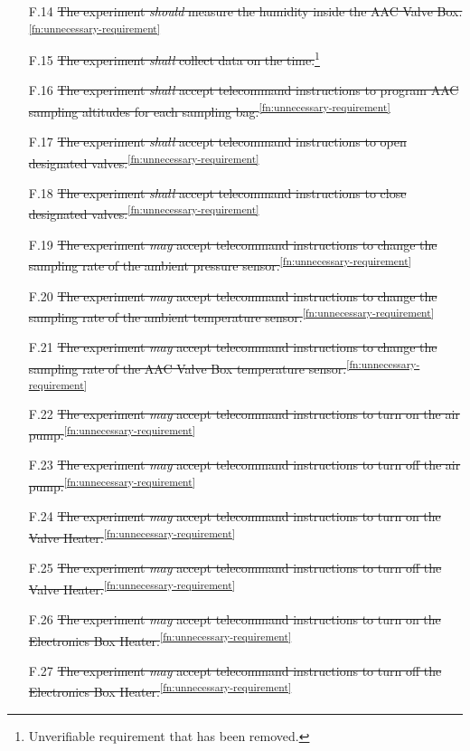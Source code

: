 \begin{enumerate}
    \item[F.14] \st{The experiment \textit{should} measure the humidity inside the AAC Valve Box.}\textsuperscript{\ref{fn:unnecessary-requirement}}
    \item[F.15] \st{The experiment \textit{shall} collect data on the time.}\footnote{Unverifiable requirement that has been removed.\label{fn:unverifiable-requirement}}
    \item[F.16] \st{The experiment \textit{shall} accept telecommand instructions to program AAC sampling altitudes for each sampling bag.}\textsuperscript{\ref{fn:unnecessary-requirement}}
    \item[F.17] \st{The experiment \textit{shall} accept telecommand instructions to open designated valves.}\textsuperscript{\ref{fn:unnecessary-requirement}}
    \item[F.18] \st{The experiment \textit{shall} accept telecommand instructions to close designated valves.}\textsuperscript{\ref{fn:unnecessary-requirement}}
    \item[F.19] \st{The experiment \textit{may} accept telecommand instructions to change the sampling rate of the ambient pressure sensor.}\textsuperscript{\ref{fn:unnecessary-requirement}}
    \item[F.20] \st{The experiment \textit{may} accept telecommand instructions to change the sampling rate of the ambient temperature sensor.}\textsuperscript{\ref{fn:unnecessary-requirement}}
    \item[F.21] \st{The experiment \textit{may} accept telecommand instructions to change the sampling rate of the AAC Valve Box temperature sensor.}\textsuperscript{\ref{fn:unnecessary-requirement}}
    \item[F.22] \st{The experiment \textit{may} accept telecommand instructions to turn on the air pump.}\textsuperscript{\ref{fn:unnecessary-requirement}}
    \item[F.23] \st{The experiment \textit{may} accept telecommand instructions to turn off the air pump.}\textsuperscript{\ref{fn:unnecessary-requirement}}
    \item[F.24] \st{The experiment \textit{may} accept telecommand instructions to turn on the Valve Heater.}\textsuperscript{\ref{fn:unnecessary-requirement}}
    \item[F.25] \st{The experiment \textit{may} accept telecommand instructions to turn off the Valve Heater.}\textsuperscript{\ref{fn:unnecessary-requirement}}
    \item[F.26] \st{The experiment \textit{may} accept telecommand instructions to turn on the Electronics Box Heater.}\textsuperscript{\ref{fn:unnecessary-requirement}}
    \item[F.27] \st{The experiment \textit{may} accept telecommand instructions to turn off the Electronics Box Heater.}\textsuperscript{\ref{fn:unnecessary-requirement}}
\end{enumerate}

